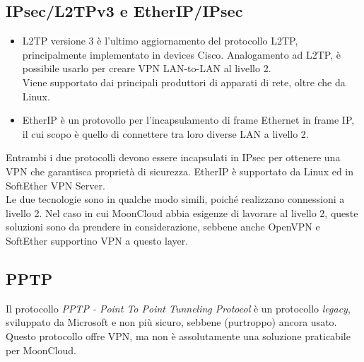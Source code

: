 \subsection{IPsec/L2TPv3 e EtherIP/IPsec}
  \begin{itemize}
    \item L2TP versione 3 è l'ultimo aggiornamento del protocollo L2TP, principalmente implementato in
    devices Cisco. Analogamento ad L2TP, è possibile usarlo per creare VPN LAN-to-LAN al livello 2.\\
    Viene supportato dai principali produttori di apparati di rete, oltre che da Linux.
    \item EtherIP è un protovollo per l'incapsulamento di frame Ethernet in frame IP, il cui scopo è quello
    di connettere tra loro diverse LAN a livello 2.
  \end{itemize}
  Entrambi i due protocolli devono essere incapsulati in IPsec per ottenere una VPN che garantisca proprietà
  di sicurezza.
  EtherIP è
  supportato da Linux ed in SoftEther VPN Server.\\
  Le due tecnologie sono in qualche modo simili, poiché realizzano connessioni a livello 2. Nel caso in cui
  MoonCloud abbia esigenze di lavorare al livello 2, queste soluzioni sono da prendere in considerazione, sebbene
  anche OpenVPN e SoftEther supportino VPN a questo layer.


\subsection{PPTP}
Il protocollo \textit{PPTP - Point To Point Tunneling Protocol} è un protocollo
\textit{legacy}, sviluppato da Microsoft e non più sicuro, sebbene (purtroppo)
ancora usato.
Questo protocollo offre VPN, ma non è assolutamente una soluzione praticabile per
MoonCloud.
